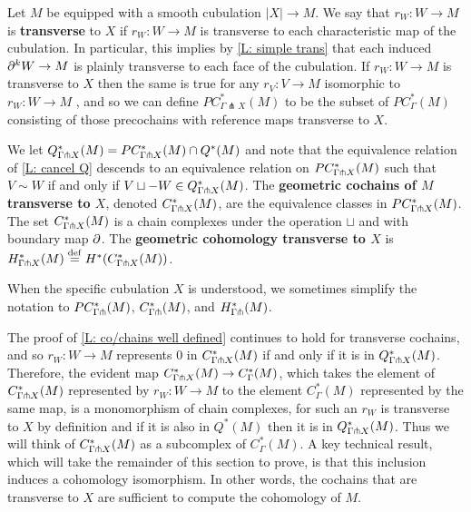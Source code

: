 \begin{definition}
Let $M$ be equipped with a smooth cubulation $|X| \to M$. We say that $r_W \colon W \to M$ is \textbf{transverse} to $X$ if $r_W: W \to M$ is transverse to each characteristic map of the cubulation. In particular, this implies by \cref{L: simple trans} that each induced $\partial^kW \to M$ is plainly transverse to each face of the cubulation. If $r_W \colon W \to M$ is transverse to $X$ then the same is true for any $r_V \colon V \to M$ isomorphic to $r_W \colon W \to M$ , and so we can define $PC^*_{\Gamma \pitchfork X}(M)$ to be the subset of $PC^*_{\Gamma}(M)$ consisting of those precochains with reference maps transverse to $X$.

We let $Q^*_{\Gamma \pitchfork X}(M) = PC_{\Gamma\pitchfork X}^*(M) \cap Q^*(M)$ and note that the equivalence relation of \cref{L: cancel Q} descends to an equivalence relation on $PC_{\Gamma\pitchfork X}^*(M)$ such that $V\sim W$ if and only if $V \sqcup -W \in Q^*_{\Gamma \pitchfork X}(M)$. The \textbf{geometric cochains of $M$ transverse to $X$}, denoted $C_{\Gamma\pitchfork X}^*(M)$, are the equivalence classes in $PC_{\Gamma\pitchfork X}^*(M)$. The set $C_{\Gamma\pitchfork X}^*(M)$ is a chain complexes under the operation $\sqcup$ and with boundary map $\partial$. The \textbf{geometric cohomology transverse to $X$} is $H_{\Gamma\pitchfork X}^*(M) \stackrel{\mathrm{def}}{=} H^*(C_{\Gamma\pitchfork X}^*(M))$.

When the specific cubulation $X$ is understood, we sometimes simplify the notation to $PC_{\Gamma\pitchfork}^*(M)$, $C_{\Gamma\pitchfork}^*(M)$, and $H_{\Gamma\pitchfork}^*(M)$.
\end{definition}

The proof of \cref{L: co/chains well defined} continues to hold for transverse cochains, and so $r_W \colon W \to M$ represents $0$ in $C^*_{\Gamma\pitchfork X}(M)$ if and only if it is in $Q^*_{\Gamma \pitchfork X}(M)$. Therefore, the evident map $C^*_{\Gamma\pitchfork X}(M) \to C^*_\Gamma(M)$, which takes the element of $C^*_{\Gamma\pitchfork X}(M)$ represented by $r_W \colon W \to M$ to the element $C^*_\Gamma(M)$ represented by the same map, is a monomorphism of chain complexes, for such an $r_W$ is transverse to $X$ by definition and if it is also in $Q^*(M)$ then it is in $Q^*_{\Gamma \pitchfork X}(M)$. Thus we will think of $C^*_{\Gamma\pitchfork X}(M)$ as a subcomplex of $C^*_\Gamma(M)$.
A key technical result, which will take the remainder of this section to prove,
is that this inclusion induces a cohomology isomorphism. In other words, the cochains that are transverse to $X$ are sufficient to compute the cohomology of $M$.

